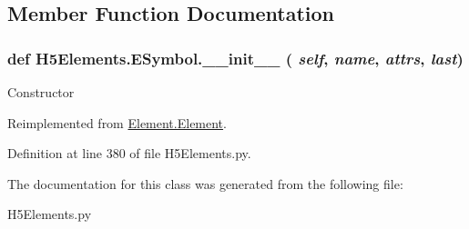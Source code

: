 \subsection{Member Function Documentation}
\hypertarget{classH5Elements_1_1ESymbol_ae29345c630720f8c56b66c6ab74c39be}{
\subsubsection[{\_\-\_\-init\_\-\_\-}]{\setlength{\rightskip}{0pt plus 5cm}def H5Elements.ESymbol.\_\-\_\-init\_\-\_\- ( {\em self}, \/   {\em name}, \/   {\em attrs}, \/   {\em last})}}
\label{classH5Elements_1_1ESymbol_ae29345c630720f8c56b66c6ab74c39be}
\begin{DoxyVerb}Constructor \end{DoxyVerb}
 

Reimplemented from \hyperlink{classElement_1_1Element_a359371465b7c4d21611adec7e86c3b33}{Element.Element}.

Definition at line 380 of file H5Elements.py.

The documentation for this class was generated from the following file:\begin{DoxyCompactItemize}
\item 
H5Elements.py\end{DoxyCompactItemize}
